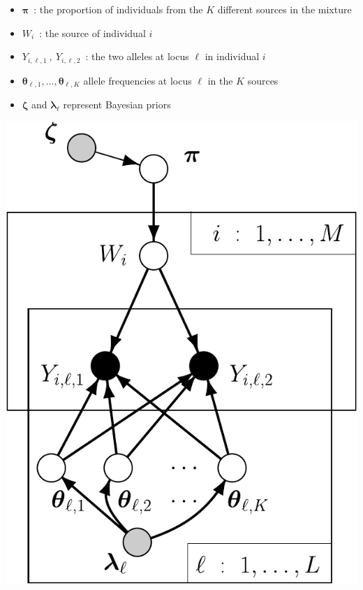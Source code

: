 
\begin{minipage}{.45\textwidth}
\begin{itemize}
\item $\bm{\pi}$~: the proportion of individuals from the $K$ different
sources in the mixture
\item $W_i$~: the source of individual $i$
\item $Y_{i,\ell,1}~,~Y_{i,\ell,2}$~: the two alleles at locus $\ell$ in
individual $i$ 
\item $\bm{\theta}_{\ell,1},\ldots,\bm{\theta}_{\ell,K}$ allele
frequencies at locus $\ell$ in the $K$ sources
\item $\bm{\zeta}$ and $\bm{\lambda}_\ell$ represent Bayesian priors
\end{itemize}
\end{minipage}
\hfill
\begin{minipage}{.475\textwidth}
\vfill
\hfill\includegraphics*[width=.95\textwidth]{illus/mixfishDAG.pdf}
\vfill
\end{minipage}

